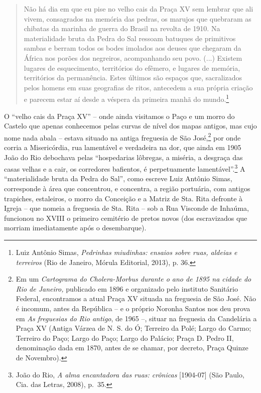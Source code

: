 \begin{quote}
Não há dia em que eu pise no velho cais da Praça XV sem lembrar que ali
vivem, consagrados na memória das pedras, os marujos que quebraram as
chibatas da marinha de guerra do Brasil na revolta de 1910. Na
materialidade bruta da Pedra do Sal ressoam batuques de primitivos
sambas e berram todos os bodes imolados aos deuses que chegaram da
África nos porões dos negreiros, acompanhando seu povo. (...) Existem
lugares de esquecimento, territórios do efêmero, e lugares de memória,
territórios da permanência. Estes últimos são espaços que, sacralizados
pelos homens em suas geografias de ritos, antecedem a sua própria
criação e parecem estar aí desde a véspera da primeira manhã do
mundo.\footnote{Luiz Antônio Simas, \emph{Pedrinhas miudinhas: ensaios
  sobre ruas, aldeias e terreiros} (Rio de Janeiro, Mórula Editorial,
  2013), p. 36.}
\end{quote}

O ``velho cais da Praça XV'' -- onde ainda visitamos o Paço e um morro
do Castelo que apenas conhecemos pelas curvas de nível dos mapas
antigos, mas cujo nome nada abala -- estava situado na antiga freguesia
de São José,\footnote{Em um \emph{Cartograma do Cholera-Morbus durante o
  ano de 1895 na cidade do Rio de Janeiro,} publicado em 1896 e
  organizado pelo instituto Sanitário Federal, encontramos a atual Praça
  XV situada na freguesia de São José. Não é incomum, antes da República
  -- e o próprio Noronha Santos nos deu prova em \emph{As freguesias do
  Rio antigo}, de 1965 --, situar na freguesia da Candelária a Praça XV
  (Antiga Várzea de N. S. do Ó; Terreiro da Polé; Largo do Carmo;
  Terreiro do Paço; Largo do Paço; Largo do Palácio; Praça D. Pedro II,
  denominação dada em 1870, antes de se chamar, por decreto, Praça
  Quinze de Novembro).} por onde corria a Misericórdia, rua lamentável e
verdadeira na dor, que ainda em 1905 João do Rio debochava pelas
``hospedarias lôbregas, a miséria, a desgraça das casas velhas e a cair,
os corredores bafientos, é perpetuamente lamentável''.\footnote{João do
  Rio, \emph{A alma encantadora das ruas: crônicas} {[}1904-07{]} (São
  Paulo, Cia. das Letras, 2008), p.~35.} A ``materialidade bruta da
Pedra do Sal'', como escreve Luiz Antônio Simas, corresponde à área que
concentrou, e concentra, a região portuária, com antigos trapiches,
estaleiros, o morro da Conceição e a Matriz de Sta. Rita defronte à
Igreja -- que nomeia a freguesia de Sta. Rita -- sob a Rua Visconde de
Inhaúma, funcionou no XVIII o primeiro cemitério de pretos novos (dos
escravizados que morriam imediatamente após o desembarque).

